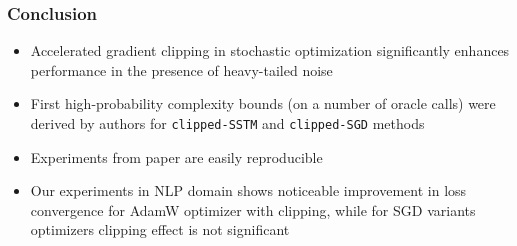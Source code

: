 \begin{frame}
\frametitle{Conclusion}
\begin{itemize}
    \item Accelerated gradient clipping in stochastic optimization significantly enhances performance in the presence of heavy-tailed noise
    \item First high-probability complexity bounds (on a number of oracle calls) were derived by authors for \texttt{clipped-SSTM} and \texttt{clipped-SGD} methods
    \item Experiments from paper are easily reproducible
    \item Our experiments in NLP domain shows noticeable improvement in loss convergence for AdamW optimizer with clipping, while for SGD variants optimizers clipping effect is not significant
\end{itemize}
\end{frame}
